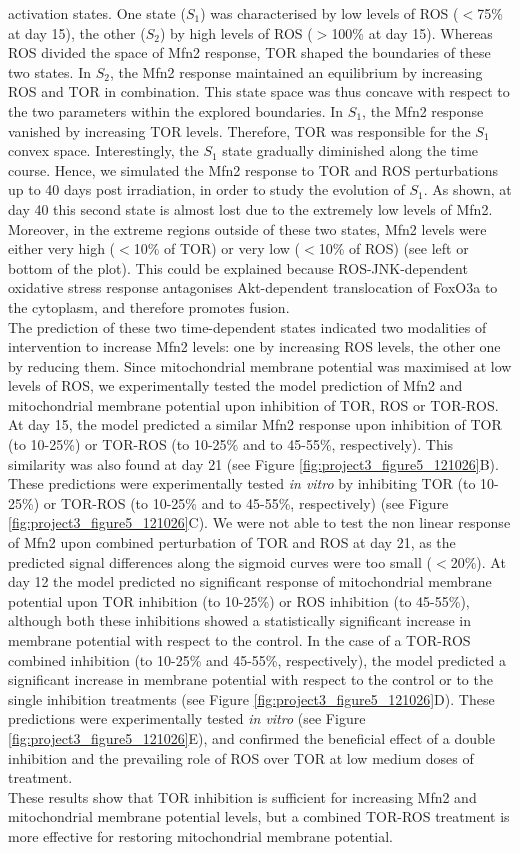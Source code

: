 activation states. One state ($S_1$) was characterised by low levels of ROS ($<$75\% at day 15), the other ($S_2$) by high levels of ROS ($>$100\% at day 15). Whereas ROS divided the space of Mfn2 response, TOR shaped the boundaries of these two states. In $S_2$, the Mfn2 response maintained an equilibrium by increasing ROS and TOR in combination. This state space was thus concave with respect to the two parameters within the explored boundaries. In $S_1$, the Mfn2 response vanished by increasing TOR levels. Therefore, TOR was responsible for the $S_1$ convex space. Interestingly, the $S_1$ state gradually diminished along the time course. Hence, we simulated the Mfn2 response to TOR and ROS perturbations up to 40 days post irradiation, in order to study the evolution of $S_1$. As shown, at day 40 this second state is almost lost due to the extremely low levels of Mfn2. Moreover, in the extreme regions outside of these two states, Mfn2 levels were either very high ($<$10\% of TOR) or very low ($<$10\% of ROS)
 (see left or bottom of the plot). This could be explained because ROS-JNK-dependent oxidative stress response antagonises Akt-dependent translocation of FoxO3a to the cytoplasm, and therefore promotes fusion. \\
The prediction of these two time-dependent states indicated two modalities of intervention to increase Mfn2 levels: one by increasing ROS levels, the other one by reducing them. Since mitochondrial membrane potential was maximised at low levels of ROS, we experimentally tested the model prediction of Mfn2 and mitochondrial membrane potential upon inhibition of TOR, ROS or TOR-ROS. At day 15, the model predicted a similar Mfn2 response upon inhibition of TOR (to 10-25\%) or TOR-ROS (to 10-25\% and to 45-55\%, respectively). This similarity was also found at day 21 (see Figure \ref{fig:project3_figure5_121026}B). These predictions were experimentally tested \emph{in vitro} by inhibiting TOR (to 10-25\%) or TOR-ROS (to 10-25\% and to 45-55\%, respectively) (see Figure \ref{fig:project3_figure5_121026}C). We were not able to test the non linear response of Mfn2 upon combined perturbation of TOR and ROS at day 21, as the predicted signal differences along the sigmoid curves were too small 
($<$20\%). At day 12 the model predicted no significant response of mitochondrial membrane potential upon TOR inhibition (to 10-25\%) or ROS inhibition (to 45-55\%), although both these inhibitions showed a statistically significant increase in membrane potential with respect to the control. In the case of a TOR-ROS combined inhibition (to 10-25\% and 45-55\%, respectively), the model predicted a significant increase in membrane potential with respect to the control or to the single inhibition treatments (see Figure \ref{fig:project3_figure5_121026}D). These predictions were experimentally tested \emph{in vitro} (see Figure \ref{fig:project3_figure5_121026}E), and confirmed the beneficial effect of a double inhibition and the prevailing role of ROS over TOR at low medium doses of treatment.\\
These results show that TOR inhibition is sufficient for increasing Mfn2 and mitochondrial membrane potential levels, but a combined TOR-ROS treatment is more effective for restoring mitochondrial membrane potential.


